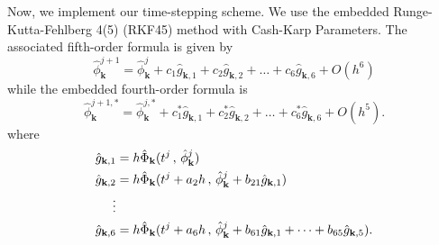 \documentclass[12pt]{article}
\begin{document}
Now, we implement our time-stepping scheme. We use the embedded Runge-Kutta-Fehlberg 4(5) (RKF45) method with Cash-Karp Parameters.  The associated fifth-order formula is given by 
\begin{equation}
\hat{\phi}_{\mathbf{k}}^{j+1}=\hat{\phi}_{\mathbf{k}}^{j}+c_{1}\hat{g}_{\mathbf{k},1}  + c_{2}\hat{g}_{\mathbf{k},2} + \dots +  c_{6}\hat{g}_{\mathbf{k},6}  + O(h^{6})
\end{equation}
while the embedded fourth-order formula is 
\begin{equation}
\hat{\phi}_{\mathbf{k}}^{j+1 , *}=\hat{\phi}_{\mathbf{k}}^{j, *}+c_{1}^{*}\hat{g}_{\mathbf{k},1}  + c_{2}^{*}\hat{g}_{\mathbf{k},2} + \dots +  c_{6}^{*}\hat{g}_{\mathbf{k},6} + O(h^{5}).
\end{equation}
where 
\begin{subequations}
	\begin{align}
		\hat{g}_{\mathbf{k},1} & = h \hat{\Phi}_{\mathbf{k}}(t^{j} \, , \, \hat{\phi}^{j}_{\mathbf{k}}) \\
		\hat{g}_{\mathbf{k},2} & = h \hat{\Phi}_{\mathbf{k}}(t^{j}+a_{2}h \, , \, \hat{\phi}^{j}_{\mathbf{k}} + b_{21}\hat{g}_{\mathbf{k},1}  ) \\
		\notag
		\vdots \\
		\hat{g}_{\mathbf{k},6} & = h \hat{\Phi}_{\mathbf{k}}(t^{j}+a_{6}h \, , \, \hat{\phi}^{j}_{\mathbf{k}} + b_{61}\hat{g}_{\mathbf{k},1}  + \dots +    b_{65}\hat{g}_{\mathbf{k},5} ) .
	\end{align}
\end{subequations}
\end{document}
